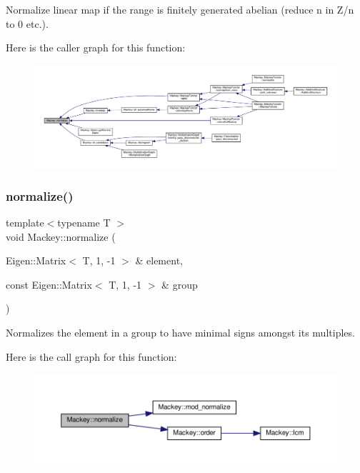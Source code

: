 Normalize linear map if the range is finitely generated abelian (reduce n in Z/n to 0 etc.). 

Here is the caller graph for this function\+:\nopagebreak
\begin{figure}[H]
\begin{center}
\leavevmode
\includegraphics[width=350pt]{namespaceMackey_a40d5c8d3e43cd2ee3df09664bc8c56ea_icgraph}
\end{center}
\end{figure}
\mbox{\label{namespaceMackey_a43e260f55a458bed50ab6a75aef7e666}} 
\subsubsection{\texorpdfstring{normalize()}{normalize()}\hspace{0.1cm}{\footnotesize\ttfamily [2/2]}}
{\footnotesize\ttfamily template$<$typename T $>$ \\
void Mackey\+::normalize (\begin{DoxyParamCaption}\item[{Eigen\+::\+Matrix$<$ T, 1, -\/1 $>$ \&}]{element,  }\item[{const Eigen\+::\+Matrix$<$ T, 1, -\/1 $>$ \&}]{group }\end{DoxyParamCaption})}



Normalizes the element in a group to have minimal signs amongst its multiples. 

Here is the call graph for this function\+:\nopagebreak
\begin{figure}[H]
\begin{center}
\leavevmode
\includegraphics[width=350pt]{namespaceMackey_a43e260f55a458bed50ab6a75aef7e666_cgraph}
\end{center}
\end{figure}
\mbox{\label{namespaceMackey_a463bb762b4edc2f283e8d1c0c466aedf}} 
